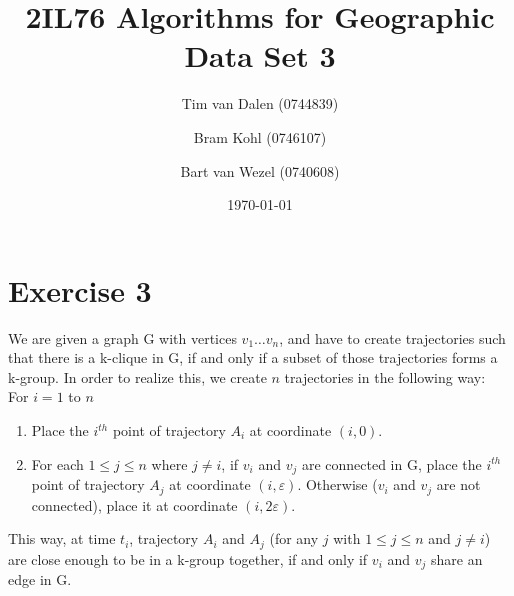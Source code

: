 \documentclass[a4paper,11pt]{article}
\title{
	2IL76 Algorithms for Geographic Data Set 3 \\
}
\author{
	Tim van Dalen (0744839)
	\and
	Bram Kohl (0746107)
	\and
	Bart van Wezel (0740608)
}
\date{\today}
\begin{document}
	\maketitle
	
\section*{Exercise 3}
We are given a graph G with vertices $v_1 \dots v_n$, and have to create trajectories such that there is a k-clique in G, if and only if a subset of those trajectories forms a k-group. In order to realize this, we create $n$ trajectories in the following way:\\
For $i = 1$ to $n$ 
\begin{enumerate}
	\item Place the $i^{th}$ point of trajectory $A_i$ at coordinate $(i, 0)$.
	\item For each $1 \leq j \leq n$ where $j \neq i$, if $v_i$ and $v_j$ are connected in G, place the $i^{th}$ point of trajectory $A_j$ at coordinate $(i,\varepsilon)$. Otherwise ($v_i$ and $v_j$ are not connected), place it at coordinate $(i,2\varepsilon)$.
\end{enumerate}
This way, at time $t_i$, trajectory $A_i$ and $A_j$ (for any $j$ with $1 \leq j \leq n$ and $j \neq i$) are close enough to be in a k-group together, if and only if $v_i$ and $v_j$ share an edge in G.
\end{document}
